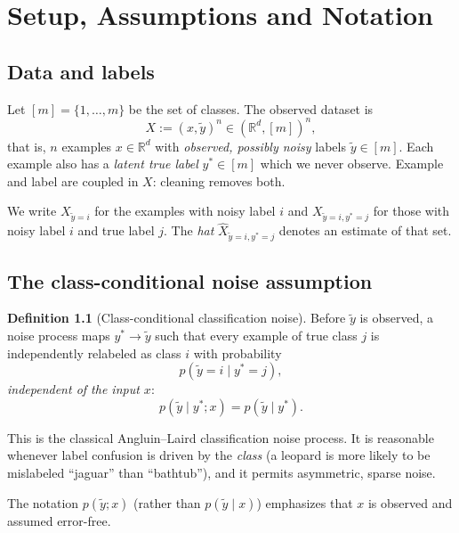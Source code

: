 \documentclass[11pt,a4paper]{report}
\newcommand{\R}{\mathbb{R}}
\newcommand{\1}{\mathbf 1}
\theoremstyle{definition}
\newtheorem{definition}{Definition}[chapter]
\theoremstyle{plain}
\theoremstyle{remark}
\begin{document}
\chapter{Setup, Assumptions and Notation}

\section{Data and labels}
Let $[m]=\{1,\dots,m\}$ be the set of classes. The observed dataset is
\[
X := (x,\tilde y)^n \in (\R^d,[m])^n,
\]
that is, $n$ examples $x\in\R^d$ with \emph{observed, possibly noisy} labels $\tilde y\in[m]$. Each example also has a \emph{latent true label} $y^*\in[m]$ which we never observe. Example and label are coupled in $X$: cleaning removes both.

We write $X_{\tilde y=i}$ for the examples with noisy label $i$ and $X_{\tilde y=i,y^*=j}$ for those with noisy label $i$ and true label $j$. The \emph{hat} $\hat X_{\tilde y=i,y^*=j}$ denotes an estimate of that set.

\section{The class-conditional noise assumption}
\begin{definition}[Class-conditional classification noise]
Before $\tilde y$ is observed, a noise process maps $y^*\to\tilde y$ such that every example of true class $j$ is independently relabeled as class $i$ with probability
\[
p(\tilde y=i\mid y^*=j),
\]
\emph{independent of the input $x$}:
\[
p(\tilde y\mid y^*;x)=p(\tilde y\mid y^*).
\]
\end{definition}
This is the classical Angluin--Laird classification noise process. It is reasonable whenever label confusion is driven by the \emph{class} (a leopard is more likely to be mislabeled ``jaguar'' than ``bathtub''), and it permits asymmetric, sparse noise.

The notation $p(\tilde y;x)$ (rather than $p(\tilde y\mid x)$) emphasizes that $x$ is observed and assumed error-free.
\end{document}
